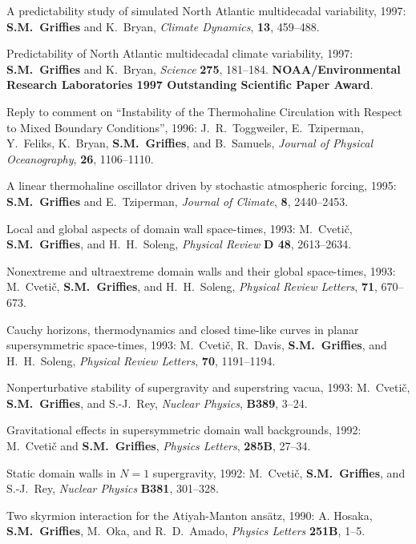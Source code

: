 \begin{etaremune}
\item A predictability study of simulated North Atlantic multidecadal
variability, 1997: {\bf S.M.\ Grif\/f\/ies} and K.\ Bryan, {\em
Climate Dynamics}, {\bf 13}, 459--488.
  
\item Predictability of North Atlantic multidecadal climate
  variability, 1997: {\bf S.M.\ Grif\/f\/ies} and K.\ Bryan, {\em
    Science} {\bf 275}, 181--184. {\bf NOAA/Environmental
    Research Laboratories 1997 Outstanding Scientific Paper Award}.
 
\item Reply to comment on ``Instability of the Thermohaline
Circulation with Respect to Mixed Boundary Conditions'', 1996: J.\ R.\
Toggweiler, E.\ Tziperman, Y.\ Feliks, K.\ Bryan, {\bf S.M.\
Grif\/f\/ies}, and B.\ Samuels, {\em Journal of Physical
Oceanography}, {\bf 26}, 1106--1110.
  
\item A linear thermohaline oscillator driven by stochastic
atmospheric forcing, 1995: {\bf S.M.\ Grif\/f\/ies} and E.\ Tziperman,
{\em Journal of Climate}, {\bf 8}, 2440--2453.

\item Local and global aspects of domain wall space-times, 1993: M.\
Cveti\v c, {\bf S.M.\ Grif\/f\/ies}, and H.\ H.\ Soleng, {\em Physical
Review} {\bf D 48}, 2613--2634.

\item Nonextreme and ultraextreme domain walls and their global
space-times, 1993: M.\ Cveti\v c, {\bf S.M.\ Grif\/f\/ies}, and H.\
H.\ Soleng, {\em Physical Review Letters}, {\bf 71}, 670--673.

\item Cauchy horizons, thermodynamics and closed time-like curves in
planar supersymmetric space-times, 1993: M.\ Cveti\v c, R.\ Davis, {\bf
S.M.\ Grif\/f\/ies}, and H.\ H.\ Soleng, {\em Physical Review
Letters}, {\bf 70}, 1191--1194.
                                                                 
\item Nonperturbative stability of supergravity and superstring vacua, 1993:
M.\ Cveti\v c, {\bf S.M.\ Grif\/f\/ies}, and S.-J.\ Rey, {\em Nuclear
Physics}, {\bf B389}, 3--24.
 
\item Gravitational effects in supersymmetric domain wall
backgrounds, 1992: M.\ Cveti\v c and {\bf S.M.\ Grif\/f\/ies}, {\em
Physics Letters}, {\bf 285B}, 27--34.

\item Static domain walls in $N=1$ supergravity, 1992: M.\ Cveti\v
c, {\bf S.M.\ Grif\/f\/ies}, and S.-J.\ Rey, {\em Nuclear Physics}
{\bf B381}, 301--328.

\item Two skyrmion interaction for the Atiyah-Manton ans\"atz, 1990: 
A. Hosaka, {\bf S.M.\ Grif\/f\/ies}, M.\ Oka, and R.\ D.\ Amado, {\em
Physics Letters} {\bf 251B}, 1--5.


\end{etaremune}

